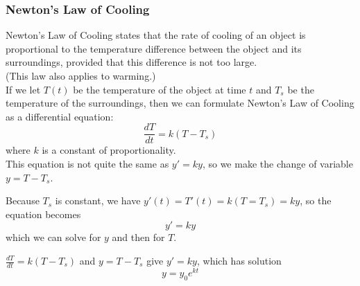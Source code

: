 \begin{frame}
\frametitle{Newton's Law of Cooling}
Newton's Law of Cooling states that the rate of cooling of an object is 
proportional to the temperature difference between the object and its 
surroundings, provided that this difference is not too large.\\
 (This law also applies to warming.) \\
  If we let $T (t)$ be the temperature of the object at time $t$ and $T_s$ 
be the temperature of the surroundings, 
then we can formulate Newton's Law of Cooling as a differential equation: 
\[
\frac{dT}{dt}=k(T-T_s)
\]
where $ k $ is a constant of proportionality.\\ 
This equation is not quite the same as $ y'=ky$, 
so we make the change of variable $y = T - T_s$.\\ \pause

 Because $T_s$ is constant, we have $y'(t) = T '(t)=k(T=T_s)=ky$, so the equation  becomes \[ y'=ky\] 
 which we can solve for $ y $ and then for $ T $.

\end{frame}

\begin{frame}
$\frac{dT}{dt}=k(T-T_s)$ and $y = T - T_s$ give  $y'=ky$, which has solution \[ y=y_0e^{kt} \]
\end{frame}


